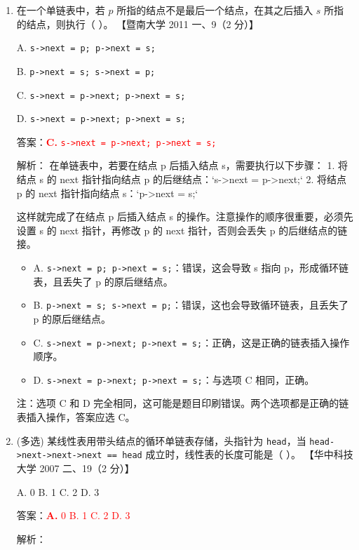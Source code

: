 \documentclass[lang=cn,newtx,10pt,scheme=chinese]{../../../elegantbook}
\begin{document}
\begin{enumerate}
        \item 在一个单链表中，若 $p$ 所指的结点不是最后一个结点，在其之后插入 $s$ 所指的结点，则执行（ ）。  
        【暨南大学 2011 一、9（2 分）】  
    
        A. \texttt{s->next = p; p->next = s;}  
    
        B. \texttt{p->next = s; s->next = p;}  
    
        C. \texttt{s->next = p->next; p->next = s;}  
    
        D. \texttt{s->next = p->next; p->next = s;}  

        答案：\textcolor{red}{\textbf{C.} \texttt{s->next = p->next; p->next = s;}}

        解析：
        在单链表中，若要在结点 p 后插入结点 s，需要执行以下步骤：
        1. 将结点 s 的 next 指针指向结点 p 的后继结点：`s->next = p->next;`
        2. 将结点 p 的 next 指针指向结点 s：`p->next = s;`

        这样就完成了在结点 p 后插入结点 s 的操作。注意操作的顺序很重要，必须先设置 s 的 next 指针，再修改 p 的 next 指针，否则会丢失 p 的后继结点的链接。

        \begin{itemize}
            \item A. \texttt{s->next = p; p->next = s;}：错误，这会导致 s 指向 p，形成循环链表，且丢失了 p 的原后继结点。
            \item B. \texttt{p->next = s; s->next = p;}：错误，这也会导致循环链表，且丢失了 p 的原后继结点。
            \item C. \texttt{s->next = p->next; p->next = s;}：正确，这是正确的链表插入操作顺序。
            \item D. \texttt{s->next = p->next; p->next = s;}：与选项 C 相同，正确。
        \end{itemize}

        注：选项 C 和 D 完全相同，这可能是题目印刷错误。两个选项都是正确的链表插入操作，答案应选 C。
        
        \item (多选) 某线性表用带头结点的循环单链表存储，头指针为 \texttt{head}，当 \texttt{head->next->next->next == head} 成立时，线性表的长度可能是（ ）。  
    【华中科技大学 2007 二、19（2 分）】  

    A. 0 \quad B. 1 \quad C. 2 \quad D. 3  

        答案：\textcolor{red}{\textbf{A.} 0 \quad B. 1 \quad C. 2 \quad D. 3}

        解析：


\end{enumerate}
\end{document}
